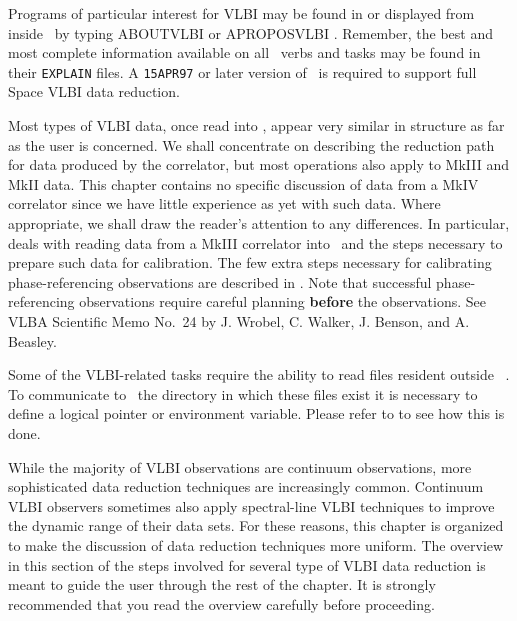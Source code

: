 Programs of particular interest for VLBI may be found in 
or displayed from inside \AIPS\ by typing {\us ABOUT\qs VLBI\CR} or
{\us APROPOS\qs VLBI \CR}\@.  Remember, the best and most complete
information available on all \AIPS\ verbs and tasks may be found in
their {\tt EXPLAIN} files.  A {\tt 15APR97} or later version of \AIPS\
is required to support full Space VLBI data reduction.

Most types of VLBI data, once read into \AIPS, appear very similar in
structure as far as the user is concerned.  We shall concentrate on
describing the reduction path for data produced by the \Indx{VLBA}
correlator, but most operations also apply to MkIII and MkII data.
This chapter contains no specific discussion of data from a MkIV
correlator since we have little experience as yet with such data.
Where appropriate, we shall draw the reader's attention to any
differences.  In particular,  deals with reading data from
a MkIII correlator into \AIPS\ and the steps necessary to prepare such
data for calibration.  The few extra steps necessary for calibrating
phase-referencing observations are described in \Sec{phaseref}.
Note that successful phase-referencing observations require careful
planning {\bf before} the observations.  See VLBA Scientific Memo
No.~24 by J. Wrobel, C. Walker, J. Benson, and A. Beasley.

Some of the VLBI-related tasks require the ability to read files
resident outside \AIPS\ .  To communicate to \AIPS\ the directory in
which these files exist it is necessary to define a logical pointer or
environment variable.  Please refer to \Sec{externfile} to see how
this is done.

While the majority of VLBI observations are continuum observations,
more sophisticated data reduction techniques are increasingly common.
Continuum VLBI observers sometimes also apply spectral-line VLBI
techniques to improve the dynamic range of their data sets.  For these
reasons, this chapter is organized to make the discussion of data
reduction techniques more uniform.  The overview in this section of
the steps involved for several type of VLBI data reduction is meant to
guide the user through the rest of the chapter.  It is strongly
recommended that you read the overview carefully before proceeding.

